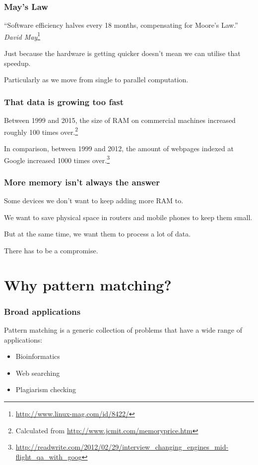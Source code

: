 \documentclass{beamer}
\begin{document}

\begin{frame}
\frametitle{May's Law}
``Software efficiency halves every 18 months, compensating for Moore's Law.''
\textit{David May}\footnote{\url{http://www.linux-mag.com/id/8422/}}

Just because the hardware is getting quicker doesn't mean we can utilise that speedup.

Particularly as we move from single to parallel computation.
\end{frame}


\begin{frame}
\frametitle{That data is growing too fast}
Between 1999 and 2015, the size of RAM on commercial machines increased roughly 100 times over.\footnote{Calculated from \url{http://www.jcmit.com/memoryprice.htm}}

In comparison, between 1999 and 2012, the amount of webpages indexed at Google increased 1000 times over.\footnote{\url{http://readwrite.com/2012/02/29/interview_changing_engines_mid-flight_qa_with_goog}}
\end{frame}


\begin{frame}
\frametitle{More memory isn't always the answer}
Some devices we don't want to keep adding more RAM to.

We want to save physical space in routers and mobile phones to keep them small.

But at the same time, we want them to process a lot of data.

There has to be a compromise.
\end{frame}

\section{Why pattern matching?}

\begin{frame}
\frametitle{Broad applications}
Pattern matching is a generic collection of problems that have a wide range of applications:

\begin{itemize}
    \item Bioinformatics
    \item Web searching
    \item Plagiarism checking
\end{itemize}
\end{frame}
\end{document}
